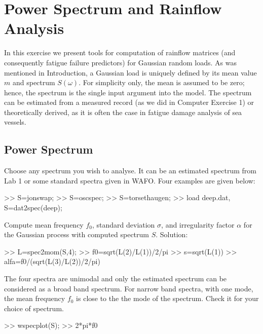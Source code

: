 \renewcommand{\FileId}{File: lab3.tex, Last changed: 2005-04-14}


\chapter{Power Spectrum and Rainflow Analysis}
\label{lab3}

In this exercise we present tools for computation of
rainflow matrices (and consequently fatigue failure predictors)
for Gaussian random loads. As was mentioned in Introduction,
a Gaussian load is uniquely defined by its mean value $m$ and
spectrum $S(\omega)$. For simplicity only, the mean is assumed to be
zero;  hence, the spectrum is the single input argument into the model.
The spectrum can be estimated from a measured record
(as we did in Computer Exercise 1) or theoretically derived,
as it is often the case  in fatigue damage analysis of sea vessels.

\section{Power Spectrum}

Choose any spectrum you wish to analyse. It can be an estimated
spectrum from Lab 1 or some standard spectra given in WAFO. Four
examples are given below:
\begin{code}
>> S=jonswap;
>> S=oscspec;
>> S=torsethaugen;
>> load deep.dat, S=dat2spec(deep);
\end{code}
Compute mean frequency $f_0$, standard deviation $\sigma$, and
irregularity factor $\alpha$ for the Gaussian process with computed
spectrum $S$. Solution:
\begin{code}
>> L=spec2mom(S,4);
>> f0=sqrt(L(2)/L(1))/2/pi
>> s=sqrt(L(1))
>> alfa=f0/(sqrt(L(3)/L(2))/2/pi)
\end{code}
The four spectra are unimodal and only the estimated spectrum can
be considered as a broad band spectrum.
For narrow band spectra, with one  mode, the
mean  frequency $f_0$ is close to the the mode of the spectrum.
Check it for your choice of spectrum.
\begin{code}
>> wspecplot(S);
>> 2*pi*f0
\end{code}



